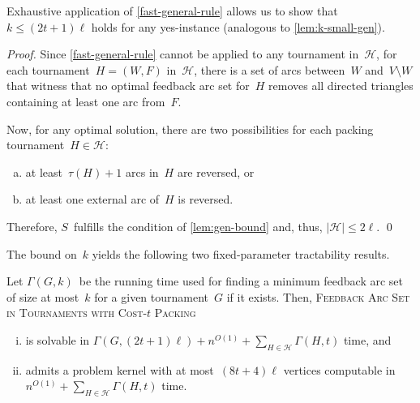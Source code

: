 \documentclass[envcountsame,numbook,smallextended]{svjour3}
\numberwithin{equation}{section}
\numberwithin{figure}{section}
\newcommand{\packing}{\ensuremath{\mathcal H}}
\newcommand{\FASTGP}{\textsc{Feedback Arc Set in Tournaments with  Cost-$t$ Packing}}
\newcommand{\Time}{\ensuremath{\Gamma}}
\begin{document}
\noindent Exhaustive application of \cref{fast-general-rule} allows us to show that~$k\le (2t+1)\ell$ holds for any yes-instance (analogous to \cref{lem:k-small-gen}).


\begin{proof}
  Since \cref{fast-general-rule} cannot be applied
  to any tournament in~$\packing$,
  for each tournament~$H=(W,F)$ in~$\packing$,
  there is a set of arcs
  between~$W$ and~$V\setminus W$
  that witness that
  no optimal feedback arc set for~$H$
  removes all directed triangles
  containing at least one arc from~$F$.
  
  Now, for any optimal solution,
  there are two possibilities
  for each packing tournament~$H\in\packing$:
  \begin{enumerate}[(a)]
  \item\label{fast-inside} at least~$\tau(H)+1$ arcs in~$H$ are reversed, or
  \item\label{fast-outside} at least one external arc of~$H$ is reversed.
  \end{enumerate}
  Therefore, $S$~fulfills the condition
  of \cref{lem:gen-bound}
  and, thus,
  $|\packing|\le 2\ell$.
\qed\end{proof}



\noindent The bound on~$k$ yields the following two fixed-parameter tractability results.

\begin{theorem}\label{fast-general-fpt}
  Let $\Time(G,k)$~be the running time used for finding a minimum feedback arc set of size at most~\(k\) for a given tournament~$G$ if it exists.  Then, \FASTGP{}
  \begin{enumerate}[(i)]
  \item\label{fvs-fpt} is solvable in $\Time(G,(2t+1)\ell) + n^{O(1)} + \sum_{H\in\packing}\Time(H,t)$ time, and
  \item\label{fvs-kern} admits a problem kernel with at most~$(8t+4)\ell$ vertices computable in~$n^{O(1)} + \sum_{H\in\packing}\Time(H,t)$ time.
  \end{enumerate}
\end{theorem}
\end{document}
